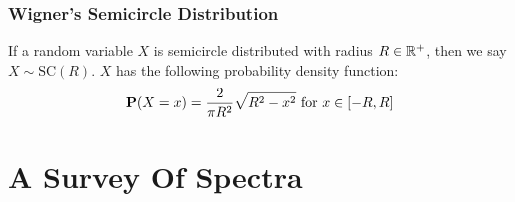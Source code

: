 \begin{frame} \frametitle{Wigner's Semicircle Distribution}

\begin{alertblock}{}
If a random variable $X$ is semicircle distributed with radius $R \in \mathbb{R}^+$, then we say $X \sim \text{SC}(R)$. $X$ has the following probability density function:
$$\textbf{P}(X = x) = \frac{2}{\pi R^2} \sqrt{R^2 - x^2} \text{ for } x \in [-R, R]$$
\end{alertblock}

\end{frame}









\section{A Survey Of Spectra}


